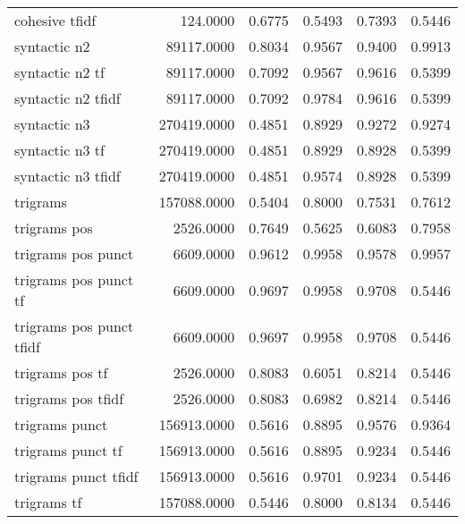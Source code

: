 \begin{tabular}{lrrrrr}
cohesive tfidf             &    124.0000 & 0.6775 &       0.5493 &         0.7393 &               0.5446 \\
syntactic n2               &  89117.0000 & 0.8034 &       0.9567 &         0.9400 &               0.9913 \\
syntactic n2 tf            &  89117.0000 & 0.7092 &       0.9567 &         0.9616 &               0.5399 \\
syntactic n2 tfidf         &  89117.0000 & 0.7092 &       0.9784 &         0.9616 &               0.5399 \\
syntactic n3               & 270419.0000 & 0.4851 &       0.8929 &         0.9272 &               0.9274 \\
syntactic n3 tf            & 270419.0000 & 0.4851 &       0.8929 &         0.8928 &               0.5399 \\
syntactic n3 tfidf         & 270419.0000 & 0.4851 &       0.9574 &         0.8928 &               0.5399 \\
trigrams                   & 157088.0000 & 0.5404 &       0.8000 &         0.7531 &               0.7612 \\
trigrams pos               &   2526.0000 & 0.7649 &       0.5625 &         0.6083 &               0.7958 \\
trigrams pos punct         &   6609.0000 & 0.9612 &       0.9958 &         0.9578 &               0.9957 \\
trigrams pos punct tf      &   6609.0000 & 0.9697 &       0.9958 &         0.9708 &               0.5446 \\
trigrams pos punct tfidf   &   6609.0000 & 0.9697 &       0.9958 &         0.9708 &               0.5446 \\
trigrams pos tf            &   2526.0000 & 0.8083 &       0.6051 &         0.8214 &               0.5446 \\
trigrams pos tfidf         &   2526.0000 & 0.8083 &       0.6982 &         0.8214 &               0.5446 \\
trigrams punct             & 156913.0000 & 0.5616 &       0.8895 &         0.9576 &               0.9364 \\
trigrams punct tf          & 156913.0000 & 0.5616 &       0.8895 &         0.9234 &               0.5446 \\
trigrams punct tfidf       & 156913.0000 & 0.5616 &       0.9701 &         0.9234 &               0.5446 \\
trigrams tf                & 157088.0000 & 0.5446 &       0.8000 &         0.8134 &               0.5446 \\

\end{tabular}
